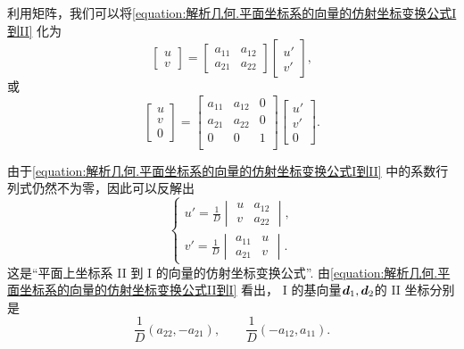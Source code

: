 利用矩阵，我们可以将\cref{equation:解析几何.平面坐标系的向量的仿射坐标变换公式I到II}
化为\begin{equation}\label{equation:解析几何.平面坐标系的向量的仿射坐标变换公式I到II.矩阵形式1}
	\begin{bmatrix}
		u \\ v
	\end{bmatrix}
	= \begin{bmatrix}
		a_{11} & a_{12} \\
		a_{21} & a_{22}
	\end{bmatrix}
	\begin{bmatrix}
		u' \\ v'
	\end{bmatrix},
\end{equation}
或\begin{equation}%
	\begin{bmatrix}
		u \\ v \\ 0
	\end{bmatrix}
	= \begin{bmatrix}
		a_{11} & a_{12} & 0 \\
		a_{21} & a_{22} & 0 \\
		0 & 0 & 1 \\
	\end{bmatrix}
	\begin{bmatrix}
		u' \\ v' \\ 0
	\end{bmatrix}.
\end{equation}

由于\cref{equation:解析几何.平面坐标系的向量的仿射坐标变换公式I到II}
中的系数行列式仍然不为零，因此可以反解出
\begin{equation}\label{equation:解析几何.平面坐标系的向量的仿射坐标变换公式II到I}
	\left\{ \begin{array}{l}
		u' = \frac{1}{D} \begin{vmatrix}
			u & a_{12} \\
			v & a_{22}
		\end{vmatrix}, \\
		v' = \frac{1}{D} \begin{vmatrix}
			a_{11} & u \\
			a_{21} & v
		\end{vmatrix}.
	\end{array} \right.
\end{equation}
这是“平面上坐标系 II 到 I 的向量的仿射坐标变换公式”.
由\cref{equation:解析几何.平面坐标系的向量的仿射坐标变换公式II到I} 看出，
I 的基向量\(\boldsymbol{d}_1,\boldsymbol{d}_2\)的 II 坐标分别是\begin{equation*}
	\frac{1}{D} (a_{22},-a_{21}), \qquad
	\frac{1}{D} (-a_{12},a_{11}).
\end{equation*}
